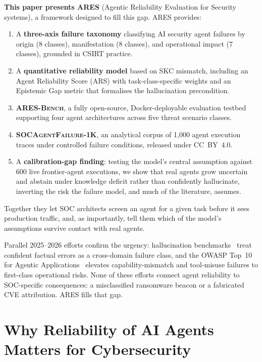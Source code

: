 \documentclass[journal,compsoc]{IEEEtran}
\newcommand{\ARES}{\textsc{ARES}}
\newcommand{\ARESBench}{\textsc{ARES-Bench}}
\newcommand{\SAFK}{\textsc{SOCAgentFailure-1K}}
\begin{document}
\textbf{This paper presents \ARES{}} (Agentic Reliability Evaluation for
Security systems), a framework designed to fill this gap. \ARES{} provides:
\begin{enumerate}[noitemsep, leftmargin=*]
  \item A \textbf{three-axis failure taxonomy} classifying AI security agent
    failures by origin (8 classes), manifestation (8 classes), and operational
    impact (7 classes), grounded in CSIRT practice.
  \item A \textbf{quantitative reliability model} based on SKC mismatch,
    including an Agent Reliability Score (ARS) with task-class-specific
    weights and an Epistemic Gap metric that formalises the hallucination
    precondition.
  \item \textbf{\ARESBench{}}, a fully open-source, Docker-deployable
    evaluation testbed supporting four agent architectures across five
    threat scenario classes.
  \item \textbf{\SAFK{}}, an analytical corpus of 1,000 agent execution
    traces under controlled failure conditions, released under CC~BY~4.0.
  \item A \textbf{calibration-gap finding}: testing the model's central
    assumption against 600 live frontier-agent executions, we show that
    real agents grow uncertain and abstain under knowledge deficit
    rather than confidently hallucinate, inverting the risk the failure
    model, and much of the literature, assumes.
\end{enumerate}

Together they let SOC architects screen an agent for a given task before
it sees production traffic, and, as importantly, tell them which of the
model's assumptions survive contact with real agents.

Parallel 2025--2026 efforts confirm the urgency: hallucination
benchmarks~\cite{bang2025hallulens} treat confident factual errors as
a cross-domain failure class, and the OWASP Top~10 for Agentic
Applications~\cite{owasp2026agentic} elevates capability-mismatch and
tool-misuse failures to first-class operational risks. None of these
efforts connect agent reliability to SOC-specific consequences: a
misclassified ransomware beacon or a fabricated CVE attribution.
\ARES{} fills that gap.

\section{Why Reliability of AI Agents Matters for Cybersecurity}
\end{document}
